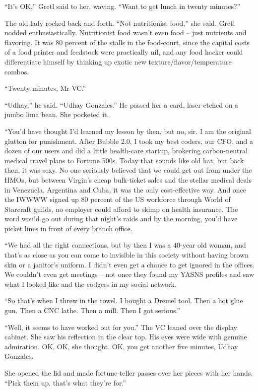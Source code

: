 “It's OK,” Gretl said to her, waving. “Want to get lunch in 
twenty minutes?”

The old lady rocked back and forth. “Not nutritionist food,” she 
said. Gretl nodded enthusiastically. Nutritionist food wasn't even food 
-- just nutrients and flavoring. It was 80 percent of the stalls in the 
food-court, since the capital costs of a food printer and feedstock 
were practically nil, and any food hacker could differentiate himself 
by thinking up exotic new texture/\-flavor/\-temperature combos.

“Twenty minutes, Mr VC.”

“Udhay,” he said. “Udhay Gonzales.” He passed her a card, 
laser-etched on a jumbo lima bean. She pocketed it.

“You'd have thought I'd learned my lesson by then, but no, sir. I am 
the original glutton for punishment. After Bubble 2.0, I took my best 
coders, our CFO, and a dozen of our users and did a little health-care 
startup, brokering carbon-neutral medical travel plans to Fortune 500s. 
Today that sounds like old hat, but back then, it was sexy. No one 
seriously believed that we could get out from under the HMOs, but 
between Virgin's cheap bulk-ticket sales and the stellar medical deals 
in Venezuela, Argentina and Cuba, it was the only cost-effective way. 
And once the IWWWW signed up 80 percent of the US workforce through 
World of Starcraft guilds, no employer could afford to skimp on health 
insurance. The word would go out during that night's raids and by the 
morning, you'd have picket lines in front of every branch office.

“We had all the right connections, but by then I was a 40-year old 
woman, and that's as close as you can come to invisible in this society 
without having brown skin or a janitor's uniform. I didn't even get a 
chance to get ignored in the offices. We couldn't even get meetings -- 
not once they found my YASNS profiles and saw what I looked like and 
the codgers in my social network.

“So that's when I threw in the towel. I bought a Dremel tool. Then a 
hot glue gun. Then a CNC lathe. Then a mill. Then I got serious.”

“Well, it seems to have worked out for you.” The VC leaned over the 
display cabinet. She saw his reflection in the clear top. His eyes were 
wide with genuine admiration. OK, OK, she thought. OK, you get another 
five minutes, Udhay Gonzales.

She opened the lid and made fortune-teller passes over her pieces with 
her hands. “Pick them up, that's what they're for.”

